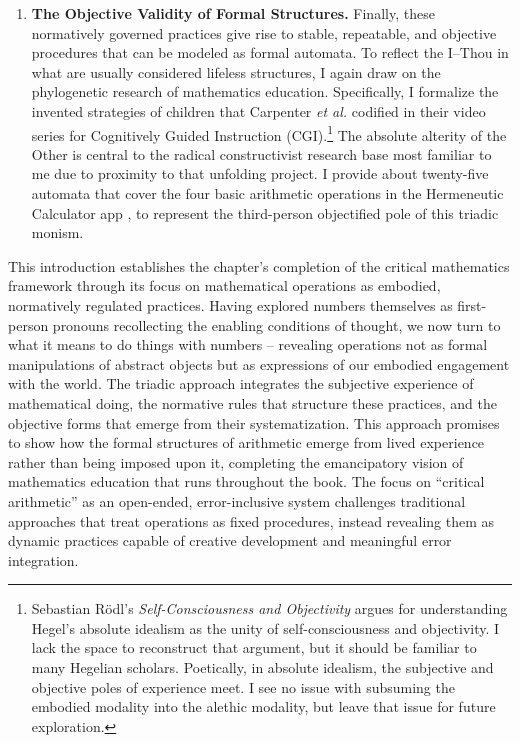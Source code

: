 \documentclass[12pt]{book}
\begin{document}
\begin{enumerate}
 \item \textbf{The Objective Validity of Formal Structures.} Finally, these normatively governed practices give rise to stable, repeatable, and objective procedures that can be modeled as formal automata. To reflect the I–Thou in what are usually considered lifeless structures, I again draw on the phylogenetic research of mathematics education. Specifically, I formalize the invented strategies of children that Carpenter \textit{et al.} \parencite*{Carpenter1999} codified in their video series for Cognitively Guided Instruction (CGI).\footnote{Sebastian R\"odl's \textit{Self-Consciousness and Objectivity} \parencite{Rodl:2018aa} argues for understanding Hegel's absolute idealism as the unity of self-consciousness and objectivity. I lack the space to reconstruct that argument, but it should be familiar to many Hegelian scholars. Poetically, in absolute idealism, the subjective and objective poles of experience meet. I see no issue with subsuming the embodied modality into the alethic modality, but leave that issue for future exploration.} The absolute alterity of the Other is central to the radical constructivist research base most familiar to me due to proximity to that unfolding project. I provide about twenty-five automata that cover the four basic arithmetic operations in the Hermeneutic Calculator app \parencite{savich_hermeneutic_nodate}, to represent the third-person objectified pole of this triadic monism.
\end{enumerate}

This introduction establishes the chapter's completion of the critical mathematics framework through its focus on mathematical operations as embodied, normatively regulated practices. Having explored numbers themselves as first-person pronouns recollecting the enabling conditions of thought, we now turn to what it means to do things with numbers -- revealing operations not as formal manipulations of abstract objects but as expressions of our embodied engagement with the world. The triadic approach integrates the subjective experience of mathematical doing, the normative rules that structure these practices, and the objective forms that emerge from their systematization. This approach promises to show how the formal structures of arithmetic emerge from lived experience rather than being imposed upon it, completing the emancipatory vision of mathematics education that runs throughout the book. The focus on ``critical arithmetic'' as an open-ended, error-inclusive system challenges traditional approaches that treat operations as fixed procedures, instead revealing them as dynamic practices capable of creative development and meaningful error integration.
\end{document}
